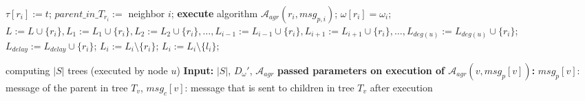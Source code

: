 \documentclass[11pt]{article}
\begin{document}
\begin{algorithm}[H]
\begin{algorithmic}[1]
                                \STATE $\tau[r_i]:=t$;
                                \STATE $parent\_in\_T_{r_i}:=$ neighbor $i$;
                                \STATE \textbf{execute} algorithm $\mathcal{A}_{agr}(r_i, msg_{p,i})$;
                                \STATE $\omega[r_i]=\omega_i$;
                                \STATE $L:=L\cup\{r_i\}, L_1:=L_1\cup\{r_i\}, L_2:=L_2\cup\{r_i\},\dots,L_{i-1}:=L_{i-1}\cup\{r_i\},L_{i+1}:=L_{i+1}\cup\{r_i\},\dots,L_{deg(u)}:=L_{deg(u)}\cup\{r_i\}$;
                                        \STATE $L_{delay}:=L_{delay}\cup\{r_i\}$;
                                \ENDIF
                        \ELSE
                                \STATE $L_i:=L_i\setminus \{r_i\}$;
                        \ENDIF
                \ELSE
                        \STATE $L_i:=L_i\setminus \{l_i\}$; 
                \ENDIF
        \ENDFOR
\ENDFOR
\end{algorithmic}
\caption{computing $|S|$ trees (executed by node $u$) \newline 
        \textbf{Input:} $|S|$, $D_\omega'$, $\mathcal{A}_{agr}$ \newline 
        \textbf{passed parameters on execution of $\mathcal{A}_{agr}(v, msg_p[v])$:} $msg_p[v]$: message of the parent in tree $T_v$, $msg_c[v]$: message that is sent to children in tree $T_v$ after execution}
\label{alg:TreeComputing}
\end{algorithm}
\end{document}
